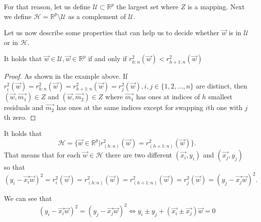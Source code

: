 For that reason, let us define  $\mathcal{U} \subset \mathbb{R}^{p}$ the largest set where $Z$ is a mapping. Next we define 
$\mathcal{H} = \mathbb{R}^{p}  \setminus   \mathcal{U}$
as a complement of $\mathcal{U}$.

Let us now describe some properties that can help us to decide whether $\vec{w}$ is in $\mathcal{U}$ or in $\mathcal{H}$.

\begin{lemma} \label{klouda1} It holds that
    $\vec{w} \in \mathcal{U}, \vec{w} \in \mathbb{R}^{p}$ if and only if 
    $r^{2}_{h:n}(\vec{w}) < r^{2}_{h+1:n}(\vec{w})$
\end{lemma}
\begin{proof}
    As shown in the example above. If $r^{2}_{i}(\vec{w}) = r^{2}_{h:n}(\vec{w}) = r^{2}_{h+1:n}(\vec{w}) = r^{2}_{j}(\vec{w}), i,j \in   \{{1,2,\ldots , n\}}$ are distinct, then $(\vec{w}, \vec{m_1}) \in Z$ and $(\vec{w}, \vec{m_2}) \in Z$ where $\vec{m_1}$ has ones at indices of $h$ smallest residuals and $\vec{m_2}$ has ones at the same indices except for swapping $i$th one with $j$th zero.
\end{proof}

\begin{corollary}
    It holds that
    \begin{equation}
        \mathcal{H} = \{{ \vec{w} \in \mathbb{R}^{p} | r^{2}_{(h:n)}(\vec{w}) = r^{2}_{(h+1:n)}(\vec{w}) \}}.
    \end{equation}
    That means that for each $\vec{w} \in \mathcal{H}$ there are two different $(\vec{x_i}, y_i)$ and  $(\vec{x_j}, y_j)$ so that
    \begin{equation}
        (y_i - \vec{x_i} \vec{w})^2 = r^{2}_i(\vec{w}) =  r^{2}_{(h:n)}(\vec{w}) = r^{2}_{(h+1:n)}(\vec{w}) =  r^{2}_j(\vec{w}) = (y_j - \vec{x_j} \vec{w})^2.
    \end{equation}

    We can see that 
    \begin{equation}
        (y_i - \vec{x_i} \vec{w})^2 =  (y_j - \vec{x_j} \vec{w})^2 \iff      y_i \pm y_j + (\vec{x_i} \pm \vec{x_j})  \vec{w} = 0
    \end{equation}
\end{corollary}


